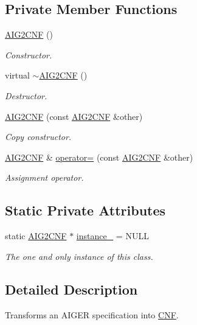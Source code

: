 \subsection*{Private Member Functions}
\begin{DoxyCompactItemize}
\item 
\hyperlink{classAIG2CNF_a2da966a41a8ff74e6ecebf0d1d3d3829}{A\-I\-G2\-C\-N\-F} ()
\begin{DoxyCompactList}\small\item\em Constructor. \end{DoxyCompactList}\item 
virtual \hyperlink{classAIG2CNF_ab97283bcce3d32f458ed7717b452e931}{$\sim$\-A\-I\-G2\-C\-N\-F} ()
\begin{DoxyCompactList}\small\item\em Destructor. \end{DoxyCompactList}\item 
\hyperlink{classAIG2CNF_a2b3b1fac1ae78ff3c9dac99cd7b63d9d}{A\-I\-G2\-C\-N\-F} (const \hyperlink{classAIG2CNF}{A\-I\-G2\-C\-N\-F} \&other)
\begin{DoxyCompactList}\small\item\em Copy constructor. \end{DoxyCompactList}\item 
\hyperlink{classAIG2CNF}{A\-I\-G2\-C\-N\-F} \& \hyperlink{classAIG2CNF_a1ee82fcfe444616f35078957ec762489}{operator=} (const \hyperlink{classAIG2CNF}{A\-I\-G2\-C\-N\-F} \&other)
\begin{DoxyCompactList}\small\item\em Assignment operator. \end{DoxyCompactList}\end{DoxyCompactItemize}
\subsection*{Static Private Attributes}
\begin{DoxyCompactItemize}
\item 
static \hyperlink{classAIG2CNF}{A\-I\-G2\-C\-N\-F} $\ast$ \hyperlink{classAIG2CNF_ae298ae4804c63f5bac4dfab7528d35ad}{instance\-\_\-} = N\-U\-L\-L
\begin{DoxyCompactList}\small\item\em The one and only instance of this class. \end{DoxyCompactList}\end{DoxyCompactItemize}


\subsection{Detailed Description}
Transforms an A\-I\-G\-E\-R specification into \hyperlink{classCNF}{C\-N\-F}. 

